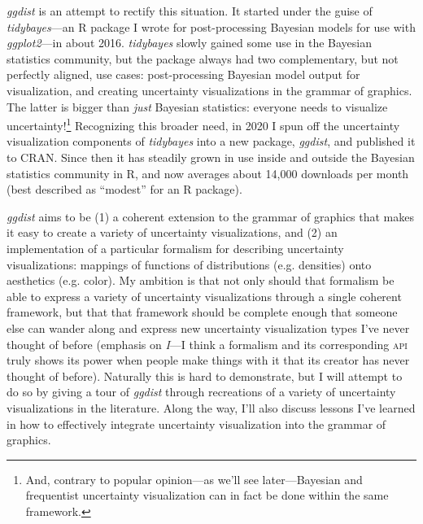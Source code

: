 \documentclass[journal]{vgtc}                     %
\begin{document}
\textit{ggdist} is an attempt to rectify this situation. It started under the guise of \textit{tidybayes}---an R package I wrote for post-processing Bayesian models for use with \textit{ggplot2}---in about 2016. \textit{tidybayes} slowly gained some use in the Bayesian statistics community, but the package always had two complementary, but not perfectly aligned, use cases: post-processing Bayesian model output for visualization, and creating uncertainty visualizations in the grammar of graphics. The latter is bigger than \textit{just} Bayesian statistics: everyone needs to visualize uncertainty!\footnote{And, contrary to popular opinion---as we'll see later---Bayesian and frequentist uncertainty visualization can in fact be done within the same framework.} Recognizing this broader need, in 2020 I spun off the uncertainty visualization components of \textit{tidybayes} into a new package, \textit{ggdist}, and published it to CRAN. Since then it has steadily grown in use inside and outside the Bayesian statistics community in R, and now averages about 14,000 downloads per month (best described as ``modest'' for an R package).

\textit{ggdist} aims to be (1) a coherent extension to the grammar of graphics that makes it easy to create a variety of uncertainty visualizations, and (2) an implementation of a particular formalism for describing uncertainty visualizations: mappings of functions of distributions (e.g. densities) onto aesthetics (e.g. color). My ambition is that not only should that formalism be able to express a variety of uncertainty visualizations through a single coherent framework, but that that framework should be complete enough that someone else can wander along and express new uncertainty visualization types I've never thought of before (emphasis on \textit{I}---I think a formalism and its corresponding \textsc{api} truly shows its power when people make things with it that its creator has never thought of before). Naturally this is hard to demonstrate, but I will attempt to do so by giving a tour of \textit{ggdist} through recreations of a variety of uncertainty visualizations in the literature. Along the way, I'll also discuss lessons I've learned in how to effectively integrate uncertainty visualization into the grammar of graphics.

\end{document}
